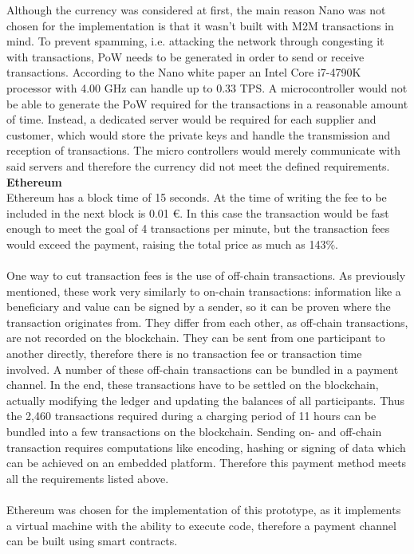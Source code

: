 Although the currency was considered at first, the main reason Nano was not chosen for the implementation is that it wasn't built with M2M transactions in mind.
To prevent spamming, i.e. attacking the network through congesting it with transactions, PoW needs to be generated in order to send or receive transactions.
According to the Nano white paper\cite{nano-white-paper} an Intel Core i7-4790K processor with 4.00 GHz can handle up to 0.33 TPS.
A microcontroller would not be able to generate the PoW required for the transactions in a reasonable amount of time.
Instead, a dedicated server would be required for each supplier and customer, which would store the private keys and handle the transmission and reception of transactions.
The micro controllers would merely communicate with said servers and therefore the currency did not meet the defined requirements.
\newpage
\textbf{Ethereum}\\
Ethereum has a block time of 15 seconds.
At the time of writing the fee to be included in the next block is 0.01 \euro\cite{ethereum-fee}.
In this case the transaction would be fast enough to meet the goal of 4 transactions per minute, but the transaction fees would exceed the payment, raising the total price as much as 143\%.
\\\\
One way to cut transaction fees is the use of off-chain transactions.
As previously mentioned, these work very similarly to on-chain transactions: information like a beneficiary and value can be signed by a sender, so it can be proven where the transaction originates from.
They differ from each other, as off-chain transactions, are not recorded on the blockchain.
They can be sent from one participant to another directly, therefore there is no transaction fee or transaction time involved.
A number of these off-chain transactions can be bundled in a payment channel.
In the end, these transactions have to be settled on the blockchain, actually modifying the ledger and updating the balances of all participants.
Thus the 2,460 transactions required during a charging period of 11 hours can be bundled into a few transactions on the blockchain.
Sending on- and off-chain transaction requires computations like encoding, hashing or signing of data which can be achieved on an embedded platform.
Therefore this payment method meets all the requirements listed above.
\\\\
Ethereum was chosen for the implementation of this prototype, as it implements a virtual machine with the ability to execute code, therefore a payment channel can be built using smart contracts.
